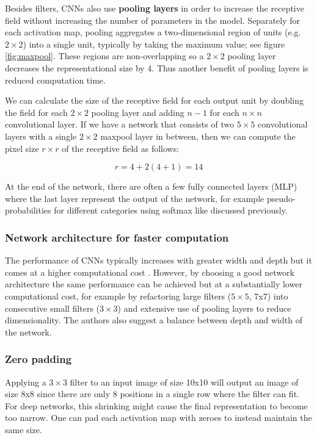 

Besides filters, CNNs also use \textbf{pooling layers} in order to increase the receptive field without increasing the number of parameters in the model.
Separately for each activation map, pooling aggregates a two-dimensional region of units (e.g. $2 \times 2$) into a single unit, typically by taking the maximum value; see figure \ref{fig:maxpool}. These regions are non-overlapping so a $2 \times 2$ pooling layer decreases the representational size by 4. Thus another benefit of pooling layers is reduced computation time.

We can calculate the size of the receptive field for each output unit by doubling the field for each $2 \times 2$ pooling layer and adding $n-1$ for each $n \times n$ convolutional layer.
If we have a network that consists of two $5 \times 5$ convolutional layers with a single $2 \times 2$ maxpool layer in between, then we can compute the pixel size $r \times r$ of the receptive field as follows:

\[
r = 4 + 2(4 + 1) = 14
\]

At the end of the network, there are often a few fully connected layers (MLP) where the last layer represent the output of the network, for example pseudo-probabilities for different categories using softmax like discussed previously.

\subsubsection{Network architecture for faster computation}

The performance of CNNs typically increases with greater width and depth but it comes at a higher computational cost \cite{InceptionV3}. However, by choosing a good network architecture the same performance can be achieved but at a substantially lower computational cost, for example by refactoring large filters ($5 \times 5$, 7x7) into consecutive small filters ($3 \times 3$) and extensive use of pooling layers to reduce dimensionality. The authors also suggest a balance between depth and width of the network.

\subsubsection{Zero padding}

Applying a $3 \times 3$ filter to an input image of size 10x10 will output an image of size 8x8 since there are only 8 positions in a single row where the filter can fit. For deep networks, this shrinking might cause the final representation to become too narrow.
One can pad each activation map with zeroes to instead maintain the same size.

